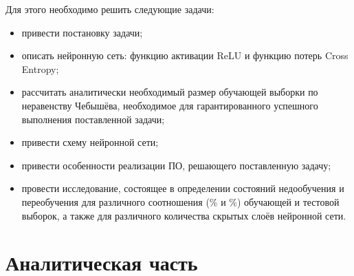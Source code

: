 \documentclass[12pt]{report}
\begin{document}
Для этого необходимо решить следующие задачи:
\begin{itemize}
    \item привести постановку задачи;
    \item описать нейронную сеть: функцию активации ReLU и функцию потерь Cross Entropy;
    \item рассчитать аналитически необходимый размер обучающей выборки по неравенству Чебышёва, необходимое для гарантированного успешного выполнения поставленной задачи;
    \item привести схему нейронной сети;
    \item привести особенности реализации ПО, решающего поставленную задачу;
    \item провести исследование, состоящее в определении состояний недообучения и переобучения для различного соотношения (\% и \%) обучающей и тестовой выборок, а также для различного количества скрытых слоёв нейронной сети.
\end{itemize}

\chapter{Аналитическая часть}
\end{document}
